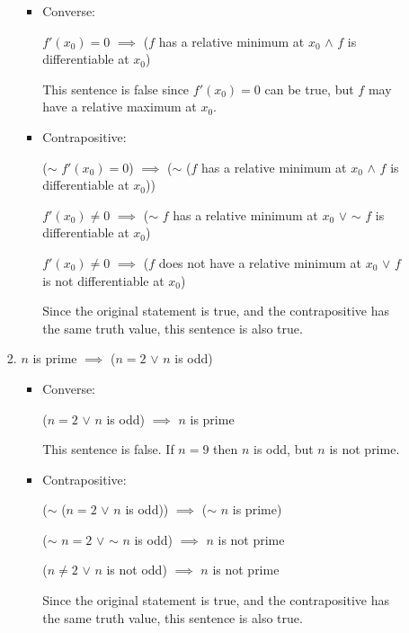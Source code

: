 \documentclass[12pt,letterpaper]{article}
\begin{document}
\begin{enumerate}
\begin{enumerate}
\begin{enumerate}
              \begin{itemize}
                \item Converse:

                  $f'(x_0) = 0$ $\implies$ ($f$ has a relative minimum at $x_0$ $\land$ $f$ is differentiable at $x_0$)

                  This sentence is false since $f'(x_0) = 0$ can be true, but $f$ may have a relative maximum at $x_0$.

                \item Contrapositive:

                  ($\sim$ $f'(x_0) = 0$) $\implies$ ($\sim$ ($f$ has a relative minimum at $x_0$ $\land$ $f$ is differentiable at $x_0$))

                  $f'(x_0) \ne 0$ $\implies$ ($\sim$ $f$ has a relative minimum at $x_0$ $\lor$ $\sim$ $f$ is differentiable at $x_0$)

                  $f'(x_0) \ne 0$ $\implies$ ($f$ does not have a relative minimum at $x_0$ $\lor$ $f$ is not differentiable at $x_0$)

                  Since the original statement is true,
                  and the contrapositive has the same truth value,
                  this sentence is also true.

              \end{itemize}

            \item
              $n$ is prime $\implies$ ($n = 2$ $\lor$ $n$ is odd)

              \begin{itemize}
                \item Converse:

                  ($n = 2$ $\lor$ $n$ is odd) $\implies$ $n$ is prime

                  This sentence is false.
                  If $n = 9$ then $n$ is odd, but $n$ is not prime.
                \item Contrapositive:

                  ($\sim$ ($n = 2$ $\lor$ $n$ is odd)) $\implies$ ($\sim$ $n$ is prime)

                  ($\sim$ $n = 2$ $\lor$ $\sim$ $n$ is odd) $\implies$ $n$ is not prime

                  ($n \ne 2$ $\lor$ $n$ is not odd) $\implies$ $n$ is not prime

                  Since the original statement is true,
                  and the contrapositive has the same truth value,
                  this sentence is also true.


\end{itemize}
\end{enumerate}
\end{enumerate}
\end{enumerate}
\end{document}
